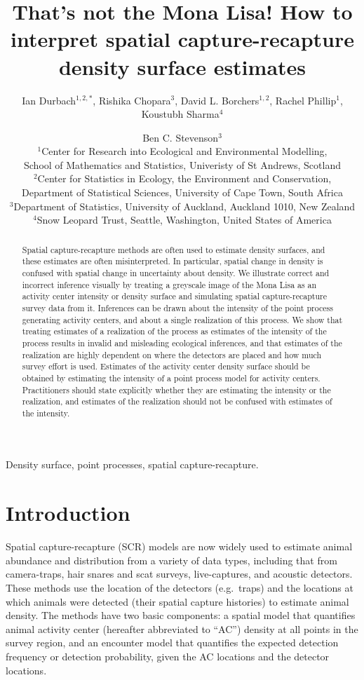 \documentclass[useAMS,usenatbib,referee]{biom}
\title[How to interpret SCR density surface estimates]{That's not the Mona Lisa! How to interpret spatial capture-recapture density surface estimates}
\author{Ian Durbach$^{1,2,*}$, Rishika Chopara$^{3}$, David L. Borchers$^{1,2}$, Rachel Phillip$^{1}$, Koustubh Sharma$^{4}$ \and Ben C. Stevenson$^{3}$ \\
$^{1}$Center for Research into Ecological and Environmental Modelling, \\ School of Mathematics and Statistics, Univeristy of St Andrews, Scotland \\
$^{2}$Center for Statistics in Ecology, the Environment and Conservation, \\ Department of Statistical Sciences, University of Cape Town, South Africa \\
$^{3}$Department of Statistics, University of Auckland, Auckland 1010, New Zealand \\
$^{4}$Snow Leopard Trust, Seattle, Washington, United States of America \\
\email{indurbach@gmail.com}}
\begin{document}
\begin{abstract}
Spatial capture-recapture methods are often used to estimate density surfaces, and these estimates are often misinterpreted. In particular, spatial change in density is confused with spatial change in uncertainty about density. We illustrate correct and incorrect inference visually by treating a greyscale image of the Mona Lisa as an activity center intensity or density surface and simulating spatial capture-recapture survey data from it. Inferences can be drawn about the intensity of the point process generating activity centers, and about a single realization of this process. We show that treating estimates of a realization of the process as estimates of the intensity of the process results in invalid and misleading ecological inferences, and that estimates of the realization are highly dependent on where the detectors are placed and how much survey effort is used. Estimates of the activity center density surface should be obtained by estimating the intensity of a point process model for activity centers. Practitioners should state explicitly whether they are estimating the intensity or the realization, and estimates of the realization should not be confused with estimates of the intensity.
\end{abstract}


\begin{keywords}
Density surface, point processes, spatial capture-recapture.
\end{keywords}

\maketitle 

\section{Introduction}

Spatial capture-recapture (SCR) models \citep*{Efford:04,Borchers+Efford:08, Royle+Young:08} are now widely used to estimate animal abundance and distribution from a variety of data types, including that from camera-traps, hair snares and scat surveys, live-captures, and acoustic detectors. These methods use the location of the detectors (e.g.\ traps) and the locations at which animals were detected (their spatial capture histories) to estimate animal density. The methods have two basic components: a spatial model that quantifies animal activity center (hereafter abbreviated to ``AC'') density at all points in the survey region, and an encounter model that quantifies the expected detection frequency or detection probability, given the AC locations and the detector locations. 
\end{document}
